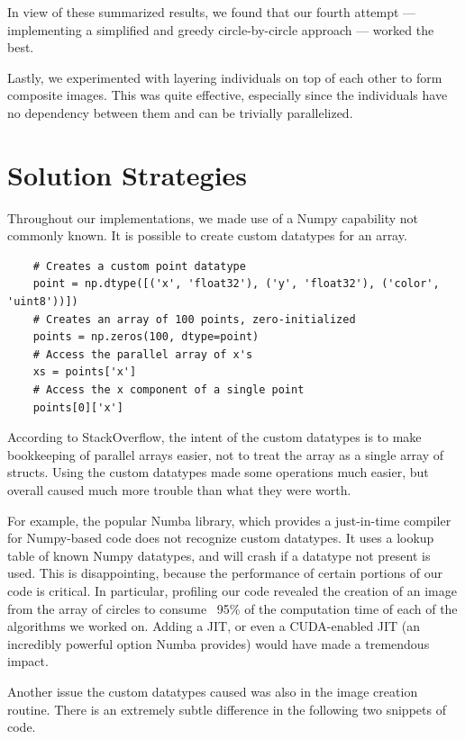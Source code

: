 \documentclass{article}
\begin{document}
    In view of these summarized results, we found that our fourth attempt --- implementing a simplified and greedy circle-by-circle approach --- worked the best.
    
    Lastly, we experimented with layering individuals on top of each other to form composite images. This was quite effective, especially since the individuals have no dependency between them and can be trivially parallelized.

\section{Solution Strategies}\label{sec:strategies}

Throughout our implementations, we made use of a Numpy capability not commonly known. It is possible to create custom datatypes for an array.

\begin{verbatim}
    # Creates a custom point datatype
    point = np.dtype([('x', 'float32'), ('y', 'float32'), ('color', 'uint8'))])
    # Creates an array of 100 points, zero-initialized
    points = np.zeros(100, dtype=point)
    # Access the parallel array of x's
    xs = points['x']
    # Access the x component of a single point
    points[0]['x']
\end{verbatim}

According to StackOverflow, the intent of the custom datatypes is to make bookkeeping of parallel arrays easier, not to treat the array as a single array of structs. Using the custom datatypes made some operations much easier, but overall caused much more trouble than what they were worth.

For example, the popular Numba library, which provides a just-in-time compiler for Numpy-based code does not recognize custom datatypes. It uses a lookup table of known Numpy datatypes, and will crash if a datatype not present is used. This is disappointing, because the performance of certain portions of our code is critical. In particular, profiling our code revealed the creation of an image from the array of circles to consume ~95\% of the computation time of each of the algorithms we worked on. Adding a JIT, or even a CUDA-enabled JIT (an incredibly powerful option Numba provides) would have made a tremendous impact.

Another issue the custom datatypes caused was also in the image creation routine. There is an extremely subtle difference in the following two snippets of code.
\end{document}
